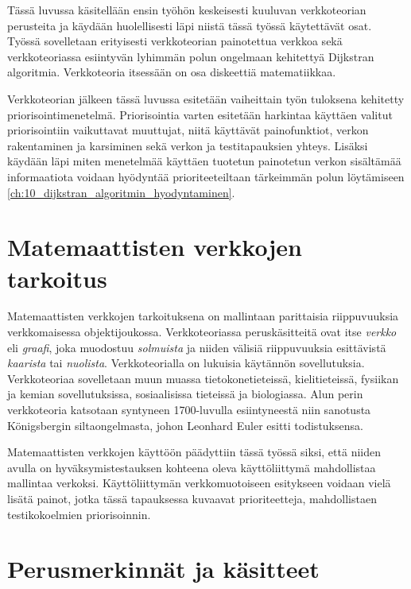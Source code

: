 Tässä luvussa käsitellään ensin työhön keskeisesti kuuluvan verkkoteorian perusteita ja käydään huolellisesti läpi niistä tässä työssä käytettävät osat.
Työssä sovelletaan erityisesti verkkoteorian painotettua verkkoa sekä verkkoteoriassa esiintyvän lyhimmän polun ongelmaan kehitettyä Dijkstran algoritmia.
Verkkoteoria itsessään on osa diskeettiä matematiikkaa.

Verkkoteorian jälkeen tässä luvussa esitetään vaiheittain työn tuloksena kehitetty priorisointimenetelmä.
Priorisointia varten esitetään harkintaa käyttäen valitut priorisointiin vaikuttavat muuttujat, niitä käyttävät painofunktiot, verkon rakentaminen ja karsiminen sekä verkon ja testitapauksien yhteys.
Lisäksi käydään läpi miten menetelmää käyttäen tuotetun painotetun verkon sisältämää informaatiota voidaan hyödyntää prioriteeteiltaan tärkeimmän polun löytämiseen \ref{ch:10_dijkstran_algoritmin_hyodyntaminen}.

\section{Matemaattisten verkkojen tarkoitus} \label{ch:09_matemaattisten_verkkojen_tarkoitus}

  Matemaattisten verkkojen tarkoituksena on mallintaan parittaisia riippuvuuksia verkkomaisessa objektijoukossa.
  Verkkoteoriassa peruskäsitteitä ovat itse \emph{verkko} eli \emph{graafi}, joka muodostuu \emph{solmuista} ja niiden välisiä riippuvuuksia esittävistä \emph{kaarista} tai \emph{nuolista}.
  Verkkoteorialla on lukuisia käytännön sovellutuksia. Verkkoteoriaa sovelletaan muun muassa tietokonetieteissä, kielitieteissä, fysiikan ja kemian sovellutuksissa, sosiaalisissa tieteissä ja biologiassa.
  Alun perin verkkoteoria katsotaan syntyneen 1700-luvulla esiintyneestä niin sanotusta Königsbergin siltaongelmasta, johon Leonhard Euler esitti todistuksensa.

  Matemaattisten verkkojen käyttöön päädyttiin tässä työssä siksi, että niiden avulla on hyväksymistestauksen kohteena oleva käyttöliittymä mahdollistaa mallintaa verkoksi.
  Käyttöliittymän verkkomuotoiseen esitykseen voidaan vielä lisätä painot, jotka tässä tapauksessa kuvaavat prioriteetteja, mahdollistaen testikokoelmien priorisoinnin.

\section{Perusmerkinnät ja käsitteet} \label{ch:09_perusmerkinnat_ja_kasitteet}


